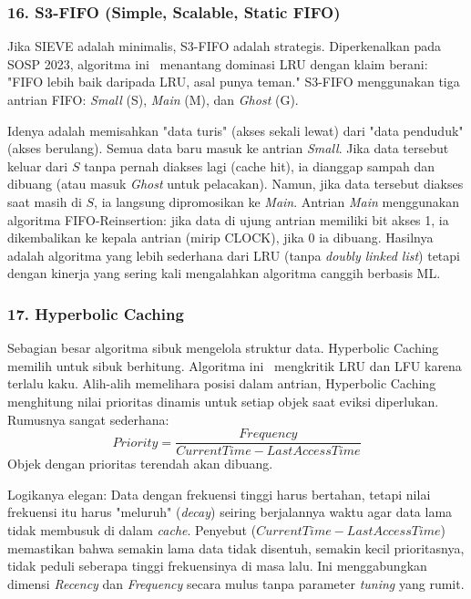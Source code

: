 \subsubsection{16. S3-FIFO (Simple, Scalable, Static FIFO)}
Jika SIEVE adalah minimalis, S3-FIFO adalah strategis.
Diperkenalkan pada SOSP 2023, algoritma ini~\cite{Yang2023S3FIFO}
menantang dominasi LRU dengan klaim berani: "FIFO lebih baik daripada
LRU, asal punya teman."
S3-FIFO menggunakan tiga antrian FIFO: \textit{Small} (S),
\textit{Main} (M), dan \textit{Ghost} (G).

Idenya adalah memisahkan "data turis" (akses sekali lewat) dari "data
penduduk" (akses berulang).
Semua data baru masuk ke antrian \textit{Small}.
Jika data tersebut keluar dari $S$ tanpa pernah diakses lagi (cache
hit), ia dianggap sampah dan dibuang (atau masuk \textit{Ghost} untuk
pelacakan).
Namun, jika data tersebut diakses saat masih di $S$, ia langsung
dipromosikan ke \textit{Main}.
Antrian \textit{Main} menggunakan algoritma FIFO-Reinsertion: jika
data di ujung antrian memiliki bit akses 1, ia dikembalikan ke kepala
antrian (mirip CLOCK), jika 0 ia dibuang.
Hasilnya adalah algoritma yang lebih sederhana dari LRU (tanpa
\textit{doubly linked list}) tetapi dengan kinerja yang sering kali
mengalahkan algoritma canggih berbasis ML.

\subsubsection{17. Hyperbolic Caching}
Sebagian besar algoritma sibuk mengelola struktur data. Hyperbolic
Caching memilih untuk sibuk berhitung.
Algoritma ini~\cite{Blankstein2017Hyperbolic} mengkritik LRU dan LFU
karena terlalu kaku.
Alih-alih memelihara posisi dalam antrian, Hyperbolic Caching
menghitung nilai prioritas dinamis untuk setiap objek saat eviksi diperlukan.
Rumusnya sangat sederhana:
\[ Priority = \frac{Frequency}{CurrentTime - LastAccessTime} \]
Objek dengan prioritas terendah akan dibuang.

Logikanya elegan: Data dengan frekuensi tinggi harus bertahan, tetapi
nilai frekuensi itu harus "meluruh" (\textit{decay}) seiring
berjalannya waktu agar data lama tidak membusuk di dalam \textit{cache}.
Penyebut ($CurrentTime - LastAccessTime$) memastikan bahwa semakin
lama data tidak disentuh, semakin kecil prioritasnya, tidak peduli
seberapa tinggi frekuensinya di masa lalu.
Ini menggabungkan dimensi \textit{Recency} dan \textit{Frequency}
secara mulus tanpa parameter \textit{tuning} yang rumit.

